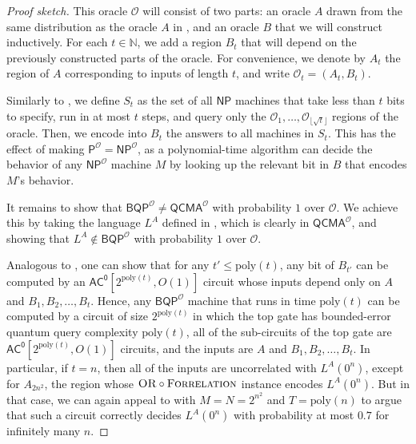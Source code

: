 \documentclass[10pt,a4paper]{article}
\newcommand{\Naturals}{\mathbb{N}}
\newcommand{\poly}{\mathrm{poly}}
\newcommand{\OR}{\normalfont\textsc{OR}}
\newcommand{\Forrelation}{\normalfont\textsc{Forrelation}}
\begin{document}
\begin{proof}[Proof sketch]
This oracle $\mathcal{O}$ will consist of two parts: an oracle $A$ drawn from the same distribution as the oracle $A$ in , and an oracle $B$ that we will construct inductively. For each $t \in \Naturals$, we add a region $B_t$ that will depend on the previously constructed parts of the oracle. For convenience, we denote by $A_t$ the region of $A$ corresponding to inputs of length $t$, and write $\mathcal{O}_t = (A_t, B_t)$.

Similarly to , we define $S_t$ as the set of all $\mathsf{NP}$ machines that take less than $t$ bits to specify, run in at most $t$ steps, and query only the $\mathcal{O}_1,\ldots,\mathcal{O}_{\lfloor \sqrt{t} \rfloor}$ regions of the oracle. Then, we encode into $B_t$ the answers to all machines in $S_t$. This has the effect of making $\mathsf{P}^\mathcal{O} = \mathsf{NP}^\mathcal{O}$, as a polynomial-time algorithm can decide the behavior of any $\mathsf{NP}^\mathcal{O}$ machine $M$ by looking up the relevant bit in $B$ that encodes $M$'s behavior.

It remains to show that $\mathsf{BQP}^\mathcal{O} \neq \mathsf{QCMA}^\mathcal{O}$ with probability $1$ over $\mathcal{O}$. We achieve this by taking the language $L^A$ defined in , which is clearly in $\mathsf{QCMA}^\mathcal{O}$, and showing that $L^A \not \in \mathsf{BQP}^\mathcal{O}$ with probability $1$ over $\mathcal{O}$.

Analogous to , one can show that for any $t' \le \poly(t)$, any bit of $B_{t'}$ can be computed by an $\mathsf{AC^0}\left[2^{\poly(t)}, O(1)\right]$ circuit whose inputs depend only on $A$ and $B_1,B_2,\ldots,B_t$. Hence, any $\mathsf{BQP}^\mathcal{O}$ machine that runs in time $\poly(t)$ can be computed by a circuit of size $2^{\poly(t)}$ in which the top gate has bounded-error quantum query complexity $\poly(t)$, all of the sub-circuits of the top gate are $\mathsf{AC^0}\left[2^{\poly(t)}, O(1)\right]$ circuits, and the inputs are $A$ and $B_1,B_2,\ldots,B_t$. In particular, if $t = n$, then all of the inputs are uncorrelated with $L^A(0^n)$, except for $A_{2n^2}$, the region whose $\OR \circ \Forrelation$ instance encodes $L^A(0^n)$. But in that case, we can again appeal to  with $M = N = 2^{n^2}$ and $T = \poly(n)$ to argue that such a circuit correctly decides $L^A(0^n)$ with probability at most $0.7$ for infinitely many $n$.
\end{proof}
\end{document}
